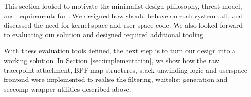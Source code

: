 This section looked to motivate the minimalist design philosophy, threat model,
and requirements for \af. We designed how \af should behave on each system call,
and discussed the need for kernel-space and user-space code. We also looked
forward to evaluating our solution and designed required additional tooling.

With these evaluation tools defined, the next step is to turn our design into a
working solution. In Section \ref{sec:implementation}, we show how the raw 
tracepoint attachment, BPF map structures, stack-unwinding logic and userspace 
frontend were implemented to realise the filtering, whitelist generation and 
seccomp-wrapper utilities described above.

